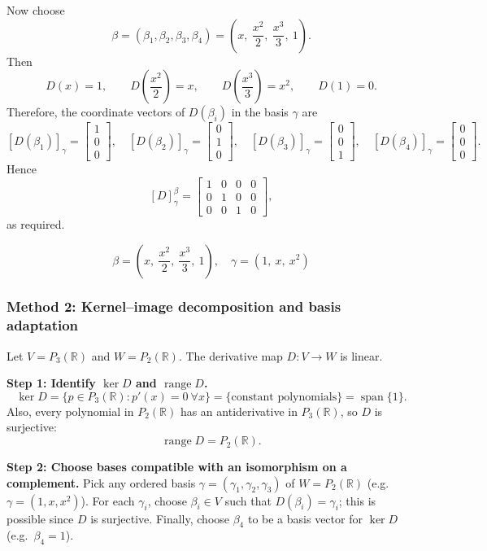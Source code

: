 \documentclass[12pt]{article}
\newcommand{\R}{\mathbb{R}}
\DeclareMathOperator{\spn}{span}
\DeclareMathOperator{\range}{range}
\begin{document}
Now choose
\[
\beta=(\beta_1,\beta_2,\beta_3,\beta_4)=\left(x,\ \frac{x^2}{2},\ \frac{x^3}{3},\ 1\right).
\]
Then
\[
D(x)=1,\qquad D\!\left(\frac{x^2}{2}\right)=x,\qquad D\!\left(\frac{x^3}{3}\right)=x^2,\qquad D(1)=0.
\]
Therefore, the coordinate vectors of $D(\beta_i)$ in the basis $\gamma$ are
\[
[D(\beta_1)]_\gamma = \begin{bmatrix}1\\0\\0\end{bmatrix},\quad
[D(\beta_2)]_\gamma = \begin{bmatrix}0\\1\\0\end{bmatrix},\quad
[D(\beta_3)]_\gamma = \begin{bmatrix}0\\0\\1\end{bmatrix},\quad
[D(\beta_4)]_\gamma = \begin{bmatrix}0\\0\\0\end{bmatrix}.
\]
Hence
\[
[D]_{\gamma}^{\beta}=
\begin{bmatrix}
1&0&0&0\\
0&1&0&0\\
0&0&1&0
\end{bmatrix},
\]
as required.

\[
\boxed{\,
\beta=\left(x,\ \frac{x^2}{2},\ \frac{x^3}{3},\ 1\right),\quad
\gamma=(1,\ x,\ x^2)\,}
\]

\subsubsection{Method 2: Kernel--image decomposition and basis adaptation}
Let $V=P_3(\R)$ and $W=P_2(\R)$. The derivative map $D:V\to W$ is linear.

\medskip
\noindent\textbf{Step 1: Identify $\ker D$ and $\range D$.}
\[
\ker D=\{p\in P_3(\R): p'(x)=0\ \forall x\}=\{\text{constant polynomials}\}=\spn\{1\}.
\]
Also, every polynomial in $P_2(\R)$ has an antiderivative in $P_3(\R)$, so $D$ is surjective:
\[
\range D = P_2(\R).
\]

\medskip
\noindent\textbf{Step 2: Choose bases compatible with an isomorphism on a complement.}
Pick any ordered basis $\gamma=(\gamma_1,\gamma_2,\gamma_3)$ of $W=P_2(\R)$ (e.g.\ $\gamma=(1,x,x^2)$).
For each $\gamma_i$, choose $\beta_i\in V$ such that $D(\beta_i)=\gamma_i$; this is possible since $D$ is surjective.
Finally, choose $\beta_4$ to be a basis vector for $\ker D$ (e.g.\ $\beta_4=1$).
\end{document}
